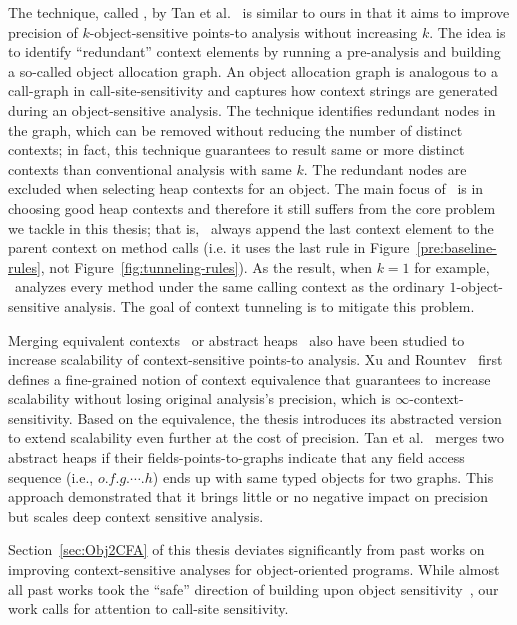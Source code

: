 The technique, called \Bean, by Tan et al.~\cite{TanLX16} is similar to ours in
that it aims to improve precision of $k$-object-sensitive points-to
analysis without increasing $k$. The idea is to identify ``redundant''
context elements by running a pre-analysis and building a so-called
object allocation graph. An object allocation graph is analogous to a
call-graph in call-site-sensitivity and captures how context strings
are generated during an object-sensitive analysis. The technique
identifies redundant nodes in the graph, which can be removed without
reducing the number of distinct contexts; in fact, this technique
guarantees to result same or more distinct contexts than conventional
analysis with same $k$. The redundant nodes are excluded when
selecting heap contexts for an object. The main focus of \Bean~is in
choosing good heap contexts and therefore it still suffers from the
core problem we tackle in this thesis; that is, \Bean~always append the
last context element to the parent context on method calls (i.e. it
uses the last rule in Figure~\ref{pre:baseline-rules}, not
Figure~\ref{fig:tunneling-rules}). As the result, when $k=1$ for
example, \Bean~analyzes every method under the same calling context as
the ordinary $1$-object-sensitive analysis. The goal of context
tunneling is to mitigate this problem.

Merging equivalent contexts~\cite{Xu2008} or abstract heaps~\cite{Tan2017} also have been studied to
increase scalability of context-sensitive points-to analysis. Xu and Rountev~\cite{Xu2008} first defines a fine-grained
notion of context equivalence that guarantees to increase scalability without losing original analysis's
precision, which is $\infty$-context-sensitivity. Based on the equivalence, the thesis introduces its abstracted
version to extend scalability even further at the cost of precision. Tan et al.~\cite{Tan2017} merges two
abstract heaps if their fields-points-to-graphs indicate that any field access sequence (i.e.,
$o.f.g.\cdots .h$) ends up with same typed objects for two graphs. This approach demonstrated that it brings
little or no negative impact on precision but scales deep context
sensitive analysis.









Section~\ref{sec:Obj2CFA} of this thesis deviates significantly from past works on improving context-sensitive analyses for object-oriented programs. 
While almost all past works took the ``safe'' direction of building upon object 
sensitivity~\cite{Smaragdakis2011,SridharanDCST12,TanLX16,Li2018b,Smaragdakis2014,Li2018a,JeJeChOh17,Liang2011,Liang2011learning,Lu:2019:PYF}, our
work calls for attention to call-site sensitivity.


